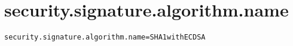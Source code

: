 \section{security.signature.algorithm.name}
\label{configuration:SecuritySignatureAlgorithmName}
\AvailableInJavaOnly{\TODO}
\begin{lstlisting}[style=Props,caption={Usage example for \textit{security.signature.algorithm.name}}]
security.signature.algorithm.name=SHA1withECDSA
\end{lstlisting}